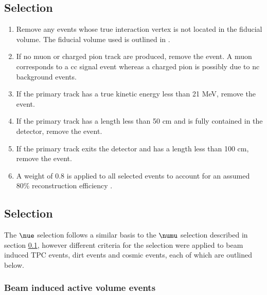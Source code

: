 \subsection{\texorpdfstring{\numu Selection}{numu Selection}}\label{sec:numu_selection}

\begin{enumerate}
  \item Remove any events whose true interaction vertex is not located in the fiducial volume. The fiducial volume used is outlined in .
  \item If no muon or charged pion track are produced, remove the event. A muon corresponds to a \gls{cc} signal event whereas a charged pion is possibly due to \gls{nc} background events. 
  \item If the primary track has a true kinetic energy less than 21 MeV, remove the event.
  \item If the primary track has a length less than 50 cm and is fully contained in the detector, remove the event.
  \item If the primary track exits the detector and has a length less than 100 cm, remove the event.
 \item A weight of 0.8 is applied to all selected events to account for an assumed 80\% reconstruction efficiency \cite{Rhiannon's_thesis}. 
\end{enumerate}

\subsection{\texorpdfstring{\nue Selection}{nue Selection}}\label{sec:nue_selection}
The $\nue$ selection follows a similar basis to the $\numu$ selection described in section \ref{sec:numu_selection}, however different criteria for the selection were applied to beam induced TPC events, dirt events and cosmic events, each of which are outlined below. 

\subsubsection*{Beam induced active volume events}

